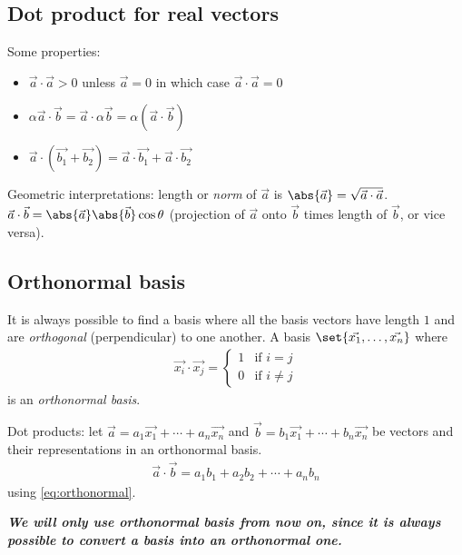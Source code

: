 \documentclass[12pt, oneside, letterpaper, fleqn]{article}
\begin{document}
\subsection{Dot product for real vectors}
Some properties:
\begin{itemize}
\item $\vec{a} \cdot \vec{a} > 0$ unless $\vec{a} = 0$ in which case
$\vec{a} \cdot \vec{a} = 0$
\item $\alpha\vec{a} \cdot \vec{b} = \vec{a} \cdot \alpha\vec{b} =
\alpha (\vec{a} \cdot \vec{b})$
\item $\vec{a} \cdot (\vec{b_1} + \vec{b_2}) = \vec{a} \cdot \vec{b_1} +
\vec{a} \cdot \vec{b_2}$
\end{itemize}

Geometric interpretations: length or \emph{norm} of $\vec{a}$ is
$\abs{\vec{a}} = \sqrt{\vec{a} \cdot \vec{a}}$. $\vec{a} \cdot \vec{b} =
\abs{\vec{a}}\abs{\vec{b}} \cos\theta$ (projection of $\vec{a}$ onto
$\vec{b}$ times length of $\vec{b}$, or vice versa).

\subsection{Orthonormal basis}
It is always possible to find a basis where all the basis vectors have
length $1$ and are \emph{orthogonal} (perpendicular) to one another.
A basis $\set{\vec{x_1}, \dotsc, \vec{x_n}}$ where
\begin{align}\label{eq:orthonormal}
\vec{x_i} \cdot \vec{x_j} = \begin{cases}
1 & \text{if } i = j\\
0 & \text{if } i \neq j
\end{cases}
\end{align}
is an \emph{orthonormal basis}.

Dot products: let $\vec{a} = a_1\vec{x_1} +\dotsb+ a_n\vec{x_n}$ and
$\vec{b} = b_1\vec{x_1} +\dotsb+ b_n\vec{x_n}$ be vectors and their
representations in an orthonormal basis.
\begin{align}
\vec{a}\cdot\vec{b} = a_1b_1 + a_2b_2 + \dotsb + a_nb_n
\end{align}
using \eqref{eq:orthonormal}.

\emph{\textbf{We will only use orthonormal
basis from now on, since it is always possible to convert a basis into
an orthonormal one.}}
\end{document}
